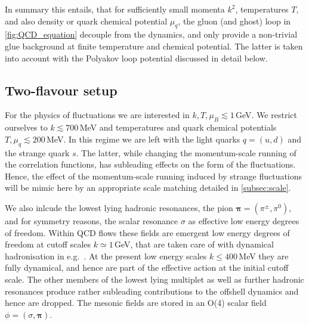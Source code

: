 \documentclass[%
reprint,
superscriptaddress,
showpacs,preprintnumbers,
amsmath,amssymb,
aps,
prd,
]{revtex4-1}
\begin{document}
	
In summary this entails, that for sufficiently small momenta $k^2$, temperatures $T$, and also density or quark chemical potential $\mu_q$, the gluon (and ghost) loop in \autoref{fig:QCD_equation} decouple from the dynamics, and only provide a non-trivial glue background at finite temperature and chemical potential. The latter is taken into account with the Polyakov loop potential discussed in detail below. 
	
\subsection{Two-flavour setup}\label{sec:Nf2LEFT}

For the physics of fluctuations we are interested in $k,T, \mu_B\lesssim 1$\,GeV. We restrict ourselves to $k\lesssim 700$\,MeV and temperatures and quark chemical potentials $T,\mu_q \lesssim 200$\,MeV. In this regime we are left with the light quarks $q=(u,d)$ and the strange quark $s$. The latter, while changing the momentum-scale running of the correlation functions, has subleading effects on the form of the fluctuations. Hence, the effect of the momentum-scale running induced by strange fluctuations will be mimic here by an appropriate scale matching detailed in \autoref{subsec:scale}. 

We also inlcude the lowest lying hadronic resonances, the pion ${\bm\pi}=(\pi^\pm,\pi^0)$, and for symmetry reasons, the scalar resonance $\sigma$ as effective low energy degrees of freedom. 
Within QCD flows these fields are emergent low energy degrees of freedom at cutoff scales $k\simeq 1$\,GeV, that are taken care of with dynamical hadronisation in e.g.\ \cite{Fu:2019hdw}. At the present low energy scales $k\leq 400$\,MeV they are fully dynamical, and hence are part of the effective action at the initial cutoff scale. The other members of the lowest lying multiplet as well as further hadronic resonances produce rather subleading contributions to the offshell dynamics and hence are dropped. The mesonic fields are stored in an O(4) scalar field $\phi=(\sigma, {\bm\pi})$. 
\end{document}
